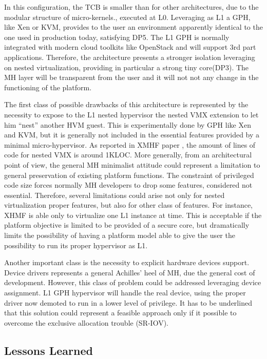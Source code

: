 \documentclass{sig-alternate}
\begin{document}
\noindent In this configuration, the TCB is smaller than for other architectures, due to the modular structure of micro-kernels., executed at L0. Leveraging as L1 a GPH, like Xen or KVM, provides to the user an environment apparently  identical to the one used in production today, satisfying DP5. The L1 GPH is normally integrated with modern cloud toolkits like OpenStack and will support 3rd part applications.
Therefore, the architecture presents a stronger isolation leveraging on nested virtualization, providing in particular a strong tiny core(DP3). The MH layer will be transparent from the user and it will not not any change in the functioning of the platform.

The first class of possible drawbacks of this architecture is represented by the necessity to expose to the L1 nested hypervisor the nested VMX extension to let him ``nest'' another HVM guest. This is experimentally done by GPH like Xen and KVM, but it is generally not included in the essential features provided by a minimal micro-hypervisor. As reported in XMHF paper \cite{xmhf}, the amount of lines of code for nested VMX is around 1KLOC. 
More generally, from an architectural point of view, the general MH minimalist attitude could represent a limitation to general preservation of existing platform functions. The constraint of privileged code size forces normally MH developers to drop some features, considered not essential. Therefore, several limitations could arise not only for nested virtualization proper features, but also for other class of features. For instance, XHMF is able only to virtualize one L1 instance at time. This is acceptable if the platform objective is limited to be provided of a secure core, but dramatically limits the possibility of having a platform model able to give the user the possibility to run its proper hypervisor as L1.

Another important class is the necessity to explicit hardware devices support. Device drivers represents a general Achilles' heel of MH, due the general cost of development. However, this class of problem could be addressed leveraging device assignment. L1 GPH hypervisor will handle the real device, using the proper driver now demoted to run in a lower level of privilege. It has to be underlined that this solution could represent a feasible approach only if it possible to overcome the exclusive allocation trouble (SR-IOV).
 
\subsection{Lessons Learned}
\end{document}
